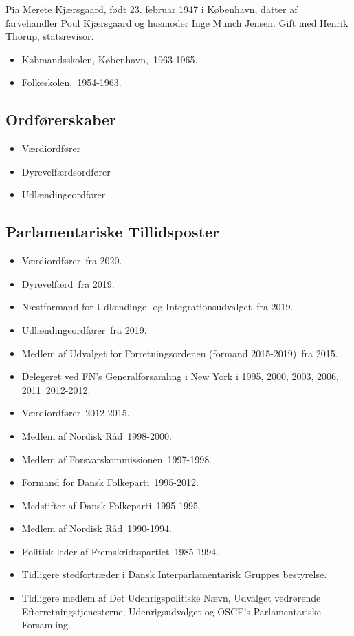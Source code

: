 \documentclass[11pt, a4paper]{awesome-cv}
\begin{document}
\makecvheader[R]
\makelettertitle
\begin{cvletter}
Pia Merete Kjærsgaard, født 23. februar 1947 i København, datter af farvehandler Poul Kjærsgaard og husmoder Inge Munch Jensen. Gift med Henrik Thorup, statsrevisor.

\begin{itemize}
\item Købmandsskolen, København, 1963-1965.
\item Folkeskolen, 1954-1963.
\end{itemize}
\subsection*{Ordførerskaber}
\begin{itemize}
\item Værdiordfører
\item Dyrevelfærdsordfører
\item Udlændingeordfører
\end{itemize}
\subsection*{Parlamentariske Tillidsposter}
\begin{itemize}
\item Værdiordfører fra 2020.
\item Dyrevelfærd fra 2019.
\item Næstformand for Udlændinge- og Integrationsudvalget fra 2019.
\item Udlændingeordfører fra 2019.
\item Medlem af Udvalget for Forretningsordenen (formand 2015-2019) fra 2015.
\item Delegeret ved FN’s Generalforsamling i New York i 1995, 2000, 2003, 2006, 2011 2012-2012.
\item Værdiordfører 2012-2015.
\item Medlem af Nordisk Råd 1998-2000.
\item Medlem af Forsvarskommissionen 1997-1998.
\item Formand for Dansk Folkeparti 1995-2012.
\item Medstifter af Dansk Folkeparti 1995-1995.
\item Medlem af Nordisk Råd 1990-1994.
\item Politisk leder af Fremskridtspartiet 1985-1994.
\item Tidligere stedfortræder i Dansk Interparlamentarisk Gruppes bestyrelse.
\item Tidligere medlem af Det Udenrigspolitiske Nævn, Udvalget vedrørende Efterretningstjenesterne, Udenrigsudvalget og OSCE’s Parlamentariske Forsamling.
\end{itemize}

\end{cvletter}
\end{document}
